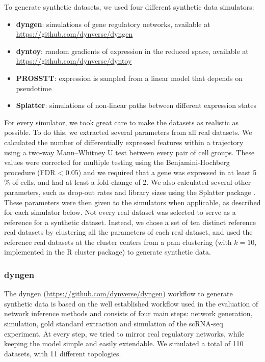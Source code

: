 To generate synthetic datasets, we used four different synthetic data simulators:

\begin{itemize}
	\item \textbf{dyngen}: simulations of gene regulatory networks, available at \href{https://github.com/dynverse/dyngen}{https://github.com/dynverse/dyngen}
	\item \textbf{dyntoy}: random gradients of expression in the reduced space, available at \href{https://github.com/dynverse/dyntoy}{https://github.com/dynverse/dyntoy}
	\item \textbf{PROSSTT}: expression is sampled from a linear model that depends on pseudotime \cite{papadopoulos_prossttprobabilisticsimulation_2018}
	\item \textbf{Splatter}: simulations of non-linear paths between different expression states \cite{zappia_splattersimulationsinglecell_2017}
\end{itemize}


For every simulator, we took great care to make the datasets as realistic as possible. To do this, we extracted several parameters from all real datasets. We calculated the number of differentially expressed features within a trajectory using a two-way Mann–Whitney U test between every pair of cell groups. These values were corrected for multiple testing using the Benjamini-Hochberg procedure (FDR < 0.05) and we required that a gene was expressed in at least 5$\%$ of cells, and had at least a fold-change of 2. We also calculated several other parameters, such as drop-out rates and library sizes using the Splatter package \cite{zappia_splattersimulationsinglecell_2017}. These parameters were then given to the simulators when applicable, as described for each simulator below. Not every real dataset was selected to serve as a reference for a synthetic dataset. Instead, we chose a set of ten distinct reference real datasets by clustering all the parameters of each real dataset, and used the reference real datasets at the cluster centers from a pam clustering (with $k = 10$, implemented in the R cluster package) to generate synthetic data.

\subsubsection{dyngen}

The dyngen (\href{https://github.com/dynverse/dyngen}{https://github.com/dynverse/dyngen}) workflow to generate synthetic data is based on the well established workflow used in the evaluation of network inference methods \cite{schaffter_genenetweaversilicobenchmark_2011,marbach_wisdomcrowdsrobust_2012} and consists of four main steps: network generation, simulation, gold standard extraction and simulation of the scRNA-seq experiment. At every step, we tried to mirror real regulatory networks, while keeping the model simple and easily extendable. We simulated a total of 110 datasets, with 11 different topologies.

